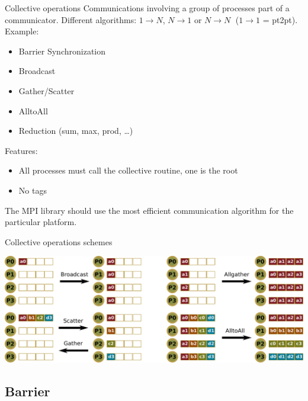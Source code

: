\documentclass[aspectratio=43]{beamer}
\begin{document}
\begin{frame}{Collective operations}
Communications involving a group of processes part of a communicator.
Different algorithms: $1\rightarrow N$, $N\rightarrow 1$ or $N\rightarrow N\;$ ($1\rightarrow 1$ = pt2pt).\\

Example:
\begin{itemize}
\item Barrier Synchronization
\item Broadcast
\item Gather/Scatter
\item AlltoAll
\item Reduction (sum, max, prod, \ldots )
\end{itemize}

Features:
\begin{itemize}
    \item All processes must call the collective routine, one is the root
    \item No tags
\end{itemize}

The MPI library should use the most efficient communication algorithm for the particular platform.
\end{frame}

\begin{frame}{Collective operations schemes}
\begin{center}
    \includegraphics[scale=0.32]{03.MPI_Coll/collop.pdf}
\end{center}
\end{frame}

\subsection{Barrier}
\end{document}
